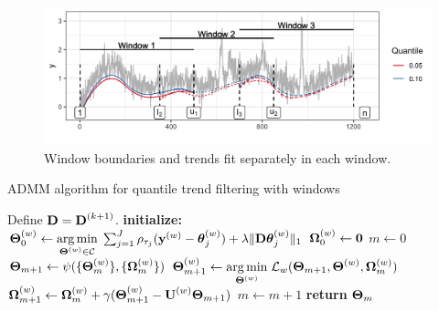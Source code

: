 \documentclass[aoas]{imsart}
\newcommand{\V}[1]{{\bm{\mathbf{\MakeLowercase{#1}}}}} %
\newcommand{\Vn}[2]{\V{#1}^{(#2)}} %
\newcommand{\M}[1]{{\bm{\mathbf{\MakeUppercase{#1}}}}} %
\newcommand{\Mn}[2]{\M{#1}^{(#2)}} %
\begin{document}
%
\begin{figure}[!t]
	\centering
	\includegraphics[width = 0.8\linewidth]{Figures/overlapping_windows.png}
	\caption{Window boundaries and trends fit separately in each window.}
	\label{fig:windows}
\end{figure}

\begin{algorithm}
	\caption{ADMM algorithm for quantile trend filtering with windows}\label{alg:admm}
	\begin{algorithmic}
		\State Define $\M{D} = \Mn{D}{k+1}$.
		\State \textbf{initialize:}
		\State $\Mn{\Theta}{w}_0 \gets \underset{\Mn{\Theta}{w} \in \mathcal{C}}{\arg \min}\;
		\sum_{j=1}^J\rho_{\tau_j}(\Vn{y}{w} - \Vn{\theta}{w}_{j})+\lambda \lVert \M{D}\Vn{\theta}{w}_{j}\rVert_1$
		\State $\Mn{\Omega}{w}_0 \gets \M{0}$
		\EndFor
		\State $m \gets 0$
		\Repeat{}
		\State $\M{\Theta}_{m+1} \gets \psi(\{\Mn{\Theta}{w}_m\}, \{\Mn{\Omega}{w}_m\})$
		\State $\Mn{\Theta}{w}_{m+1} \gets \underset{\Mn{\Theta}{w}}{\arg\min}\; \mathcal{L}_w(\M{\Theta}_{m+1}, \Mn{\Theta}{w}, \Mn{\Omega}{w}_{m})$
		\State
		$\Mn{\Omega}{w}_{m+1} \gets \Mn{\Omega}{w}_m + \gamma(\Mn{\Theta}{w}_{m+1} - \Mn{U}{w}\M{\Theta}_{m+1})$
		\EndFor
		\State $m \gets m + 1$
		\State \textbf{return} $\M{\Theta}_m$
	\end{algorithmic}
\end{algorithm}
\end{document}
